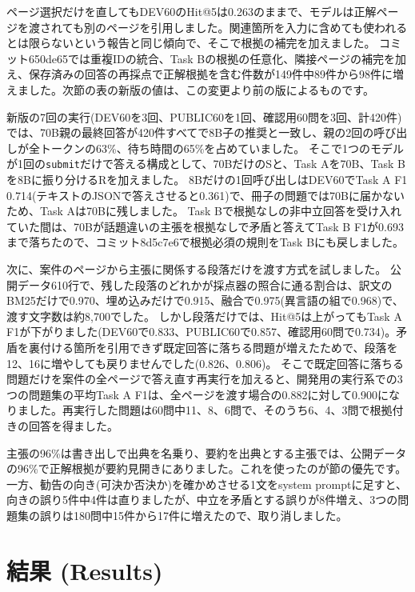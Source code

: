 \documentclass[10pt,a4paper]{ltjsarticle}
\begin{document}
ページ選択だけを直してもDEV60のHit@5は0.263のままで、モデルは正解ページを渡されても別のページを引用しました。関連箇所を入力に含めても使われるとは限らないという報告\cite{liu2023lost,hsieh2024ruler}と同じ傾向で、そこで根拠の補完を加えました。
コミット650de65では重複IDの統合、Task Bの根拠の任意化、隣接ページの補完を加え、保存済みの回答の再採点で正解根拠を含む件数が149件中89件から98件に増えました。次節の表の新版の値は、この変更より前の版によるものです。

新版の7回の実行(DEV60を3回、PUBLIC60を1回、確認用60問を3回、計420件)では、70B親の最終回答が420件すべてで8B子の推奨と一致し、親の2回の呼び出しが全トークンの63\%、待ち時間の65\%を占めていました。
そこで1つのモデルが1回の\texttt{submit}だけで答える構成として、70BだけのSと、Task Aを70B、Task Bを8Bに振り分けるRを加えました。
8Bだけの1回呼び出しはDEV60でTask A F1 0.714(テキストのJSONで答えさせると0.361)で、冊子の問題では70Bに届かないため、Task Aは70Bに残しました。
Task Bで根拠なしの非中立回答を受け入れていた間は、70Bが話題違いの主張を根拠なしで矛盾と答えてTask B F1が0.693まで落ちたので、コミット8d5c7e6で根拠必須の規則をTask Bにも戻しました。

次に、案件のページから主張に関係する段落だけを渡す方式を試しました。
公開データ610行で、残した段落のどれかが採点器の照合に通る割合は、訳文のBM25だけで0.970、埋め込みだけで0.915、融合で0.975(異言語の組で0.968)で、渡す文字数は約8,700でした。
しかし段落だけでは、Hit@5は上がってもTask A F1が下がりました(DEV60で0.833、PUBLIC60で0.857、確認用60問で0.734)。矛盾を裏付ける箇所を引用できず既定回答に落ちる問題が増えたためで、段落を12、16に増やしても戻りませんでした(0.826、0.806)。
そこで既定回答に落ちる問題だけを案件の全ページで答え直す再実行を加えると、開発用の実行系での3つの問題集の平均Task A F1は、全ページを渡す場合の0.882に対して0.900になりました。再実行した問題は60問中11、8、6問で、そのうち6、4、3問で根拠付きの回答を得ました。

主張の96\%は書き出しで出典を名乗り、要約を出典とする主張では、公開データの96\%で正解根拠が要約見開きにありました。これを使ったのが節の優先です。
一方、勧告の向き(可決か否決か)を確かめさせる1文をsystem promptに足すと、向きの誤り5件中4件は直りましたが、中立を矛盾とする誤りが8件増え、3つの問題集の誤りは180問中15件から17件に増えたので、取り消しました。

\section{結果 (Results)}
\end{document}

